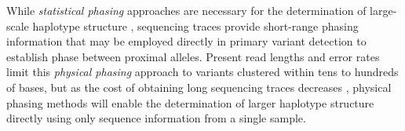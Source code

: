 \documentclass{article}
\begin{document}

While \emph{statistical phasing} approaches are necessary for the determination of large-scale haplotype structure \citep{browning2007, mach2010, delaneau2012, howie2011}, sequencing traces provide short-range phasing information that may be employed directly in primary variant detection to establish phase between proximal alleles.  Present read lengths and error rates limit this \emph{physical phasing} approach to variants clustered within tens to hundreds of bases, but as the cost of obtaining long sequencing traces decreases \citep{branton2008, clarke2009}, physical phasing methods will enable the determination of larger haplotype structure directly using only sequence information from a single sample.
\end{document}
